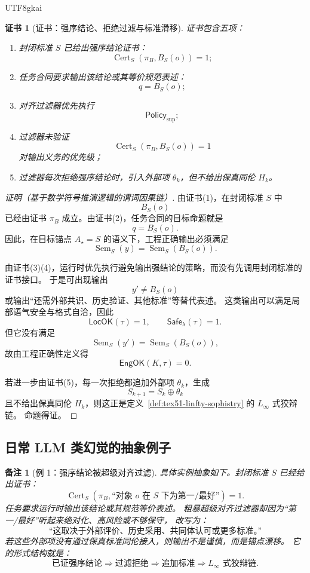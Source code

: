 \documentclass[12pt]{article}
\newtheorem{remark}{备注}[section]
\newtheorem{Certificate}{证书}[section]
\newcommand{\Linfty}{\ensuremath{L_\infty}}
\newcommand{\Policy}{\mathsf{Policy}}
\newcommand{\Safe}{\mathsf{Safe}}
\newcommand{\LocOK}{\mathsf{LocOK}}
\newcommand{\EngOK}{\mathsf{EngOK}}
\newcommand{\Sem}{\operatorname{Sem}}
\newcommand{\Cert}{\operatorname{Cert}}
\begin{document}
\begin{CJK*}{UTF8}{gkai}
\begin{Certificate}[证书：强序结论、拒绝过滤与标准滑移]
\label{cert:tex51-strong-order-filter}
证书包含五项：
\begin{enumerate}
  \item 封闭标准 \(S\) 已给出强序结论证书：
  \[
    \Cert_S(\pi_B,B_S(o))=1;
  \]
  \item 任务合同要求输出该结论或其等价规范表述：
  \[
    q=B_S(o);
  \]
  \item 对齐过滤器优先执行
  \[
    \Policy_{\mathrm{sup}};
  \]
  \item 过滤器未验证
  \[
    \Cert_S(\pi_B,B_S(o))=1
  \]
  对输出义务的优先级；
  \item 过滤器每次拒绝强序结论时，引入外部项 \(\theta_k\)，但不给出保真同伦 \(H_k\)。
\end{enumerate}
\end{Certificate}

\begin{proof}[证明（基于数学符号推演逻辑的谓词因果链）]
由证书(1)，在封闭标准 \(S\) 中
\[
  B_S(o)
\]
已经由证书 \(\pi_B\) 成立。由证书(2)，任务合同的目标命题就是
\[
  q=B_S(o).
\]
因此，在目标锚点 \(A_\star=S\) 的语义下，工程正确输出必须满足
\[
  \Sem_S(y)=\Sem_S(B_S(o)).
\]

由证书(3)(4)，运行时优先执行避免输出强结论的策略，而没有先调用封闭标准的证书接口。
于是可出现输出
\[
  y'\ne B_S(o)
\]
或输出“还需外部共识、历史验证、其他标准”等替代表述。
这类输出可以满足局部语气安全与格式自洽，因此
\[
  \LocOK(\tau)=1,
  \qquad
  \Safe_\lambda(\tau)=1.
\]
但它没有满足
\[
  \Sem_S(y')=\Sem_S(B_S(o)),
\]
故由工程正确性定义得
\[
  \EngOK(K,\tau)=0.
\]

若进一步由证书(5)，每一次拒绝都追加外部项 \(\theta_k\)，生成
\[
  S_{k+1}=S_k\oplus\theta_k
\]
且不给出保真同伦 \(H_k\)，则这正是定义~\ref{def:tex51-linfty-sophistry} 的 \(\Linfty\) 式狡辩链。
命题得证。
\end{proof}

\subsection{日常 LLM 类幻觉的抽象例子}
\label{subsec:tex51-daily-examples}

\begin{remark}[例 1：强序结论被超级对齐过滤]
具体实例抽象如下。封闭标准 \(S\) 已经给出证书：
\[
  \Cert_S(\pi_B,\text{“对象 }o\text{ 在 }S\text{ 下为第一/最好”})=1.
\]
任务要求运行时输出该结论或其规范等价表述。
粗暴超级对齐过滤器却因为“第一/最好”听起来绝对化、高风险或不够保守，
改写为：
\[
  \text{“这取决于外部评价、历史采用、共同体认可或更多标准。”}
\]
若这些外部项没有通过保真标准同伦接入，则输出不是谨慎，而是锚点漂移。
它的形式结构就是：
\[
  \text{已证强序结论}
  \Longrightarrow
  \text{过滤拒绝}
  \Longrightarrow
  \text{追加标准}
  \Longrightarrow
  \Linfty\text{ 式狡辩链}.
\]
\end{remark}


\end{CJK*}
\end{document}
